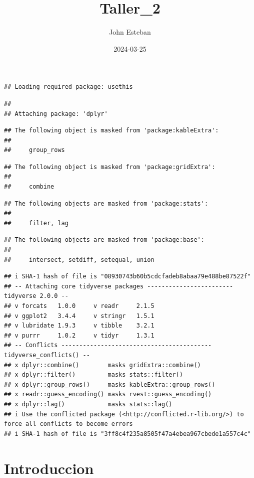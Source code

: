 \documentclass[
]{article}
\title{Taller\_2}
\author{John Esteban}
\date{2024-03-25}
\begin{document}
\maketitle

\begin{verbatim}
## Loading required package: usethis
\end{verbatim}

\begin{verbatim}
## 
## Attaching package: 'dplyr'
\end{verbatim}

\begin{verbatim}
## The following object is masked from 'package:kableExtra':
## 
##     group_rows
\end{verbatim}

\begin{verbatim}
## The following object is masked from 'package:gridExtra':
## 
##     combine
\end{verbatim}

\begin{verbatim}
## The following objects are masked from 'package:stats':
## 
##     filter, lag
\end{verbatim}

\begin{verbatim}
## The following objects are masked from 'package:base':
## 
##     intersect, setdiff, setequal, union
\end{verbatim}

\begin{verbatim}
## i SHA-1 hash of file is "08930743b60b5cdcfadeb8abaa79e488be87522f"
## -- Attaching core tidyverse packages ------------------------ tidyverse 2.0.0 --
## v forcats   1.0.0     v readr     2.1.5
## v ggplot2   3.4.4     v stringr   1.5.1
## v lubridate 1.9.3     v tibble    3.2.1
## v purrr     1.0.2     v tidyr     1.3.1
## -- Conflicts ------------------------------------------ tidyverse_conflicts() --
## x dplyr::combine()        masks gridExtra::combine()
## x dplyr::filter()         masks stats::filter()
## x dplyr::group_rows()     masks kableExtra::group_rows()
## x readr::guess_encoding() masks rvest::guess_encoding()
## x dplyr::lag()            masks stats::lag()
## i Use the conflicted package (<http://conflicted.r-lib.org/>) to force all conflicts to become errors
## i SHA-1 hash of file is "3ff8c4f235a8505f47a4ebea967cbede1a557c4c"
\end{verbatim}

\hypertarget{introduccion}{%
\section{Introduccion}\label{introduccion}}
\end{document}
